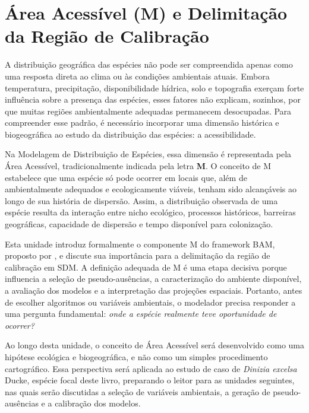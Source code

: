 
\chapter{Área Acessível (M) e Delimitação da Região de Calibração}

\begin{chapteropening}
	A distribuição geográfica das espécies não pode ser compreendida apenas como uma resposta direta ao clima ou às condições ambientais atuais. Embora temperatura, precipitação, disponibilidade hídrica, solo e topografia exerçam forte influência sobre a presença das espécies, esses fatores não explicam, sozinhos, por que muitas regiões ambientalmente adequadas permanecem desocupadas. Para compreender esse padrão, é necessário incorporar uma dimensão histórica e biogeográfica ao estudo da distribuição das espécies: a acessibilidade.
	
	Na Modelagem de Distribuição de Espécies, essa dimensão é representada pela Área Acessível, tradicionalmente indicada pela letra \textbf{M}. O conceito de M estabelece que uma espécie só pode ocorrer em locais que, além de ambientalmente adequados e ecologicamente viáveis, tenham sido alcançáveis ao longo de sua história de dispersão. Assim, a distribuição observada de uma espécie resulta da interação entre nicho ecológico, processos históricos, barreiras geográficas, capacidade de dispersão e tempo disponível para colonização.
	
	Esta unidade introduz formalmente o componente M do framework BAM, proposto por \textcite{Soberon2007}, e discute sua importância para a delimitação da região de calibração em SDM. A definição adequada de M é uma etapa decisiva porque influencia a seleção de pseudo-ausências, a caracterização do ambiente disponível, a avaliação dos modelos e a interpretação das projeções espaciais. Portanto, antes de escolher algoritmos ou variáveis ambientais, o modelador precisa responder a uma pergunta fundamental: \textit{onde a espécie realmente teve oportunidade de ocorrer?}
	
	Ao longo desta unidade, o conceito de Área Acessível será desenvolvido como uma hipótese ecológica e biogeográfica, e não como um simples procedimento cartográfico. Essa perspectiva será aplicada ao estudo de caso de \textit{Dinizia excelsa} Ducke, espécie focal deste livro, preparando o leitor para as unidades seguintes, nas quais serão discutidas a seleção de variáveis ambientais, a geração de pseudo-ausências e a calibração dos modelos.
\end{chapteropening}

